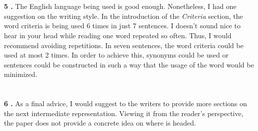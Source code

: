 \documentclass{article}
\begin{document}
    \section*{}
    \textbf{5 .} The English language being used is good enough. Nonetheless, I had one suggestion on the writing style. In the introduction of the \textit{Criteria} section, the word criteria is being used 6 times in just 7 sentences. I doesn't sound nice to hear in your head while reading one word repeated so often. Thus, I would recommend avoiding repetitions. In seven sentences, the word criteria could be used at most 2 times. In order to achieve this, synonyms could be used or sentences could be constructed in such a way that the usage of the word would be minimized. 
    
    \section*{}
    \textbf{6 .} As a final advice, I would suggest to the writers to provide more sections on the next intermediate representation. Viewing it from the reader's perspective, the paper does not provide a concrete idea on where is headed.  
    
\end{document}
